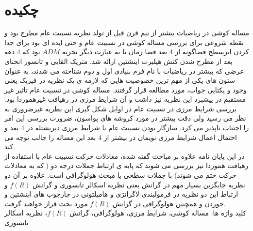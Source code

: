 \label{chekide}
\chapter*{چکیده}
مساله کوشی در ریاضیات بیشتر از نیم قرن قبل از تولد نظریه نسبیت عام مطرح بود و نقطه شروعی برای بررسی مساله کوشی در نسبیت عام و حتی ایده ای بود برای جدا کردن ابرسطح فضاگونه از 4 بعد فضا زمان یا به عبارت دیگر تجزیه $ADM$ بود که 4 دهه بعد از مطرح شدن کنش هیلبرت اینشتین ارائه شد. متریک القایی  و تانسور انحنای عرضی که پیشتر در ریاضیات با نام فرم بنیادی اول و دوم شناخته می شدند، به عنوان ستون های یکی از مهم ترین خصوصیت هایی که لازمه ی یک نظریه در فیزیک یعنی وجود و یکتایی جواب، مورد مطالعه قرار گرفتند. مساله کوشی در نسبیت عام تاثیر غیر مستقیم در پیشبرد این نظریه نیز داشت و آن شرایط مرزی در رهیافت غیرهموردا بود. بررسی شرایط مرزی در نسبیت عام در اوایل شکل گیری این نظریه غیرضروری به نظر می رسید ولی دقت بیشتر در مورد کروشه های پواسون، ضرورت بررسی این امر را اجتناب ناپذیر می کرد. سازگار بودن نسبیت عام با شرایط مرزی دیریشتله در 4 بعد و احتمال اعمال شرایط مرزی نویمان در بیشتر از 4 بعد این مساله را جالب توجه می کند.\\
در این پایان نامه علاوه بر مباحث گفته شده، معادلات حرکت نسبیت عام با استفاده از رهیافت هموردا نیز بررسی می شوند که پایه ی ارتباط جملات درجه دو ( که به معادلات حرکت ختم می شوند) با جملات سطحی یا مبحث هولوگرافی است. علاوه بر آن دو نظریه جایگزین بسیار مهم در گرانش یعنی نظریه اسکالر تانسوری و گرانش $f(R)$ و ارتباط این دو نظریه در فرمولبندی لاگرانژی و هامیلتونی در چارچوب های اینشتین و جوردن و همچنین هولوگرافی در گرانش $f(R)$ مورد بحث قرار خواهند گرفت.\\
کلید واژه ها: مساله کوشی، شرایط مرزی، هولوگرافی، گرانش $f(R)$، نظریه اسکالر تانسوری